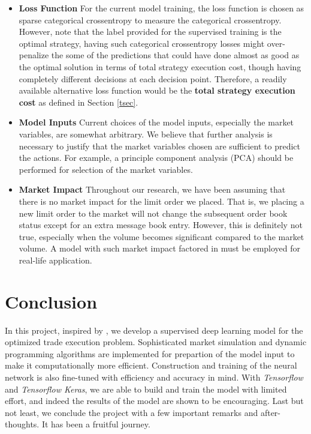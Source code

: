 \documentclass[12pt]{extarticle}
\begin{document}
\begin{itemize}
  \item \textbf{Loss Function} For the current model training, the loss function is chosen as
  sparse categorical crossentropy to measure the categorical crossentropy.
  However, note that the label provided for the supervised training is the optimal
  strategy, having such categorical crossentropy losses might over-penalize the
  some of the predictions that could have done almost as good as the optimal solution
  in terms of total strategy execution cost, though having completely different decisions
  at each decision point. Therefore, a readily available alternative loss function
  would be the \textbf{total strategy execution cost} as defined in Section \ref{tsec}.\\

  \item \textbf{Model Inputs} Current choices of the model inputs, especially the
  market variables, are somewhat arbitrary. We believe that further analysis is necessary
  to justify that the market variables chosen are sufficient to predict the actions.
  For example, a principle component analysis (PCA) should be performed for selection of the
  market variables.

  \item \textbf{Market Impact} Throughout our research, we have been assuming that
  there is no market impact for the limit order we placed. That is, we placing a new
  limit order to the market will not change the subsequent order book status except
  for an extra message book entry. However, this is definitely not true, especially
  when the volume becomes significant compared to the market volume. A model with such
  market impact factored in \cite{market-impact} must be employed for real-life application.
\end{itemize}

\section{Conclusion}
In this project, inspired by \cite{reinforcement}, we develop a supervised deep learning model for the optimized trade
execution problem. Sophisticated market simulation and dynamic programming algorithms
are implemented for prepartion of the model input to make it computationally more
efficient. Construction and training of the neural network is also fine-tuned with
efficiency and accuracy in mind. With \textit{Tensorflow} and \textit{Tensorflow Keras},
we are able to build and train the model with limited effort, and indeed the results of the
model are shown to be encouraging. Last but not least, we conclude the project with
a few important remarks and after-thoughts. It has been a fruitful journey.
\end{document}
